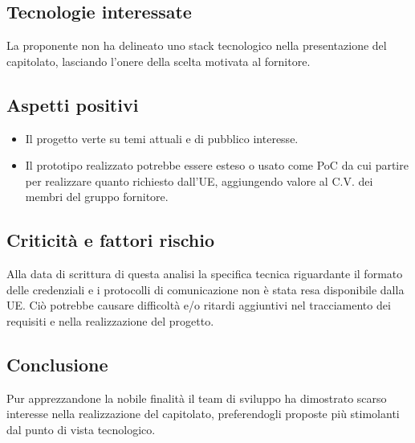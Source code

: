 \subsection{Tecnologie interessate}
La proponente non ha delineato uno stack tecnologico nella presentazione del capitolato, lasciando l’onere della scelta motivata al fornitore.

\subsection{Aspetti positivi}
    \begin{itemize}
        \item Il progetto verte su temi attuali e di pubblico interesse.
        \item Il prototipo realizzato potrebbe essere esteso o usato come PoC da cui partire per realizzare quanto richiesto dall'UE, aggiungendo valore al C.V. dei membri del gruppo fornitore.
    \end{itemize}

\subsection{Criticità e fattori rischio}
Alla data di scrittura di questa analisi la specifica tecnica riguardante il formato delle credenziali e i protocolli di comunicazione non è stata resa disponibile dalla UE. Ciò potrebbe causare difficoltà e/o ritardi aggiuntivi nel tracciamento dei requisiti e nella realizzazione del progetto.

\subsection{Conclusione}
Pur apprezzandone la nobile finalità il team di sviluppo ha dimostrato scarso interesse nella realizzazione del capitolato, preferendogli proposte più stimolanti dal punto di vista tecnologico.

